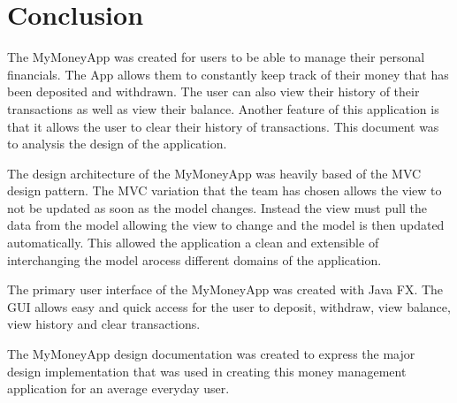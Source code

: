 \documentclass[12pt]{article}
\begin{document}
\section{Conclusion}
The MyMoneyApp was created for users to be able to manage their personal financials. The App allows them to constantly keep track of their money that has been deposited and withdrawn. The user can also view their history of their transactions as well as view their balance. Another feature of this application is that it allows the user to clear their history of transactions. This document was to analysis the design of the application.

The design architecture of the MyMoneyApp was heavily based of the MVC design pattern. The MVC variation that the team has chosen allows the view to not be updated as soon as the model changes. Instead the view must pull the data from the model allowing the view to change and the model is then updated automatically. This allowed the application a clean and extensible of interchanging the model arocess different domains of the application.

The primary user interface of the MyMoneyApp was created with Java FX. The GUI allows easy and quick access for the user to deposit, withdraw, view balance, view history and clear transactions. 

The MyMoneyApp design documentation was created to express the major design implementation that was used in creating this money management application for an average everyday user.
\end{document}
